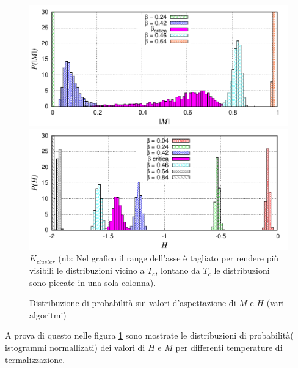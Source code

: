  \begin {figure}[h!]
    \begin{center}
	\caption[1) ParteA\_distroM.cpp $\rightarrow$ distroM\_file.p \quad $/\;$ 2) ParteA\_distroH.cpp $\rightarrow$ distroH\_file.p ]{Distribuzione di probabilità sui valori d'aspettazione di $M$ e $H$ (\footnotesize vari algoritmi)}\label{fig: DistroM}
        \includegraphics[scale=1]{Immagini/ParteA/distroM}
     \newline    
        \includegraphics[scale=1]{Immagini/ParteA/distroH}
     \newline   
		\footnotesize $K_{cluster}$ \newline(nb: Nel grafico il range dell'asse è tagliato per rendere più visibili le distribuzioni vicino a $T_c$, lontano da $T_c$ le distribuzioni sono piccate in una sola colonna).   
    \end{center}
 \end {figure}
A prova di questo nelle figura \ref{fig: DistroM} sono mostrate le distribuzioni di probabilità( istogrammi normallizati) dei valori di $H$ e $M$ per differenti temperature di termalizzazione.